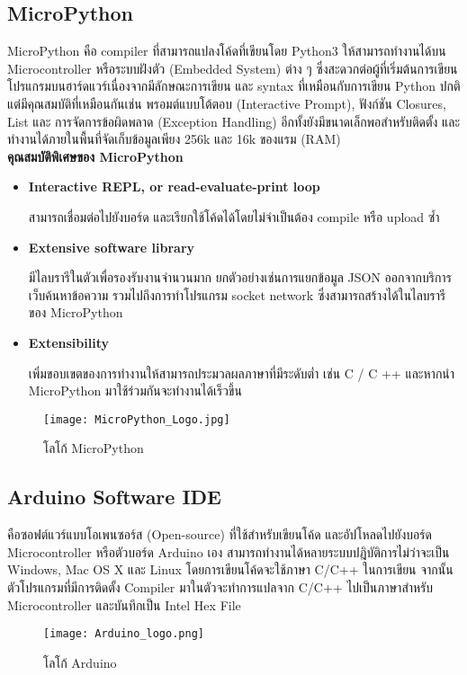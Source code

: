 \subsection{MicroPython}
MicroPython คือ compiler ที่สามารถแปลงโค้ดที่เขียนโดย Python3 ให้สามารถทำงานได้บน Microcontroller หรือระบบฝังตัว (Embedded System) ต่าง ๆ ซึ่งสะดวกต่อผู้ที่เริ่มต้นการเขียนโปรแกรมบนฮาร์ดแวร์เนื่องจากมีลักษณะการเขียน และ syntax ที่เหมือนกับการเขียน Python ปกติ แต่มีคุณสมบัติที่เหมือนกันเช่น พรอมต์แบบโต้ตอบ (Interactive Prompt), ฟังก์ชัน Closures, List และ การจัดการข้อผิดพลาด (Exception Handling) อีกทั้งยังมีขนาดเล็กพอสำหรับติดตั้ง และทำงานได้ภายในพื้นที่จัดเก็บข้อมูลเพียง 256k และ 16k ของแรม (RAM) \cite{MicroPython}
\\\textbf{คุณสมบัติพิเศษของ MicroPython} \cite{MicroPythonBasic}
\begin{itemize}
    \itemsep0em
    \item \textbf{Interactive REPL, or read-evaluate-print loop}
    
    สามารถเชื่อมต่อไปยังบอร์ด และเรียกใช้โค้ดได้โดยไม่จำเป็นต้อง compile หรือ upload ซ้ำ
    
    \item \textbf{Extensive software library}
    
    มีไลบรารีในตัวเพื่อรองรับงานจำนวนมาก ยกตัวอย่างเช่นการแยกข้อมูล JSON ออกจากบริการเว็บค้นหาข้อความ รวมไปถึงการทำโปรแกรม socket network ซึ่งสามารถสร้างได้ในไลบรารีของ MicroPython
    
    \item \textbf{Extensibility}
    
    เพิ่มขอบเขตของการทำงานให้สามารถประมวลผลภาษาที่มีระดับต่ำ เช่น C / C ++ และหากนำ MicroPython มาใช้ร่วมกันจะทำงานได้เร็วขึ้น
\end{itemize}
\begin{figure}
    \centering
    \texttt{[image: MicroPython\_Logo.jpg]}
    \caption{โลโก้ MicroPython}
    \label{fig:MicroPython}
\end{figure}

\newpage\subsection{Arduino Software IDE}
คือซอฟต์แวร์แบบโอเพนซอร์ส (Open-source) ที่ใช้สำหรับเขียนโค้ด และอัปโหลดไปยังบอร์ด Microcontroller หรือตัวบอร์ด Arduino เอง สามารถทำงานได้หลายระบบปฎิบัติการไม่ว่าจะเป็น Windows, Mac OS X และ Linux โดยการเขียนโค้ดจะใช้ภาษา C/C++ ในการเขียน จากนั้นตัวโปรแกรมที่มีการติดตั้ง Compiler มาในตัวจะทำการแปลจาก C/C++  ไปเป็นภาษาสำหรับ Microcontroller และบันทึกเป็น Intel Hex File \cite{Arduino}
\begin{figure}[ht]
    \centering
    \texttt{[image: Arduino\_logo.png]}
    \caption{โลโก้ Arduino}
    \label{fig:Arduino}
\end{figure}
